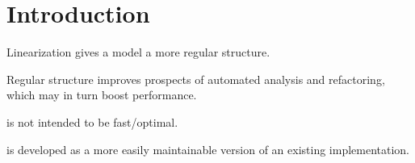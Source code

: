 \chapter{Introduction}

Linearization gives a model a more regular structure.

Regular structure improves prospects of automated analysis and refactoring, which may in turn boost performance.

\lpeq{} is not intended to be fast/optimal.

\lpeq{} is developed as a more easily maintainable version of an existing implementation.

